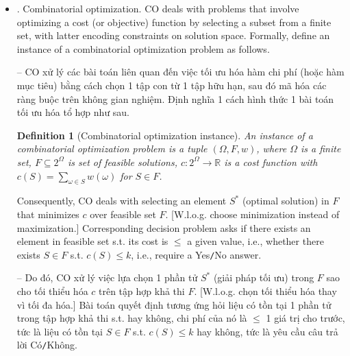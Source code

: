 \documentclass{article}
\newtheorem{definition}{Definition}
\begin{document}
\begin{itemize}
\begin{itemize}
        Say 2 graphs $G,H$ are isomorphic if there exists an edge-preserving bijection $\varphi:V(G)\to V(H)$, i.e., $(u,v)\in E(G)\Leftrightarrow(\varphi(u),\varphi(v))\in E(H)$. For labeled graphs, further require $l(v) = l(\varphi(v))$ for $v\in V(G)$ \& $l((u,v)) = l((\varphi(u),\varphi(v)))$ for $(u,v)\in E(G)$.

        -- Giả sử 2 đồ thị $G,H$ là đẳng cấu nếu tồn tại 1 song ánh bảo toàn cạnh $\varphi:V(G)\to V(H)$, tức là $(u,v)\in E(G)\Leftrightarrow(\varphi(u),\varphi(v))\in E(H)$. Đối với đồ thị có nhãn, cần thêm $l(v) = l(\varphi(v))$ với $v\in V(G)$ \& $l((u,v)) = l((\varphi(u),\varphi(v)))$ với $(u,v)\in E(G)$.
        \item {. Combinatorial optimization.} CO deals with problems that involve optimizing a cost (or objective) function by selecting a subset from a finite set, with latter encoding constraints on solution space. Formally, define an instance of a combinatorial optimization problem as follows.

        -- CO xử lý các bài toán liên quan đến việc tối ưu hóa hàm chi phí (hoặc hàm mục tiêu) bằng cách chọn 1 tập con từ 1 tập hữu hạn, sau đó mã hóa các ràng buộc trên không gian nghiệm. Định nghĩa 1 cách hình thức 1 bài toán tối ưu hóa tổ hợp như sau.

        \begin{definition}[Combinatorial optimization instance]
               An instance of a {\rm combinatorial optimization problem} is a tuple $(\Omega,F,w)$, where $\Omega$ is a finite set, $F\subseteq2^\Omega$ is set of feasible solutions, $c:2^\Omega\to\mathbb{R}$ is a {\rm cost function} with $c(S) = \sum_{\omega\in S} w(\omega)$ for $S\in F$.
        \end{definition}
        Consequently, CO deals with selecting an element $S^*$ (optimal solution) in $F$ that minimizes $c$ over feasible set $F$. [W.l.o.g. choose minimization instead of maximization.] Corresponding decision problem asks if there exists an element in feasible set s.t. its cost is $\le$ a given value, i.e., whether there exists $S\in F$ s.t. $c(S)\le k$, i.e., require a Yes{\tt/}No answer.

        -- Do đó, CO xử lý việc lựa chọn 1 phần tử $S^*$ (giải pháp tối ưu) trong $F$ sao cho tối thiểu hóa $c$ trên tập hợp khả thi $F$. [W.l.o.g. chọn tối thiểu hóa thay vì tối đa hóa.] Bài toán quyết định tương ứng hỏi liệu có tồn tại 1 phần tử trong tập hợp khả thi s.t. hay không, chi phí của nó là $\le$ 1 giá trị cho trước, tức là liệu có tồn tại $S\in F$ s.t. $c(S)\le k$ hay không, tức là yêu cầu câu trả lời Có{\tt/}Không.


\end{itemize}
\end{itemize}
\end{document}

